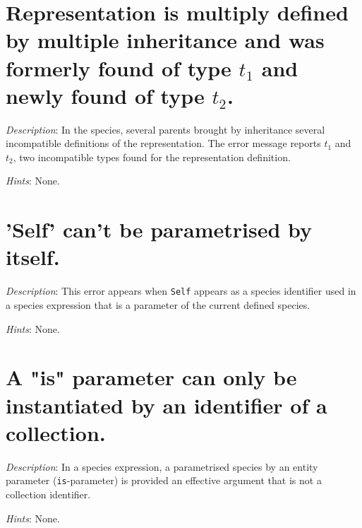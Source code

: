 \section*{Representation is multiply defined by multiple
  inheritance and was formerly found of type $t_1$ and newly found of
  type $t_2$.}

{\em Description}: In the species, several parents brought by
inheritance several incompatible definitions of the representation. The error message reports $t_1$ and $t_2$, two incompatible
types found for the representation definition.

{\em Hints}: None.



\section*{'Self' can't be parametrised by itself.}

{\em Description}: This error appears when {\tt Self} appears as a
species identifier used in a species expression that is a parameter of
the current defined species.



{\em Hints}: None.



\section*{A  "is"  parameter can only be  instantiated by an identifier of a collection.}

{\em Description}: In a species expression, a parametrised species by
an entity parameter ({\tt is}-parameter) is provided an effective
argument that is not a collection identifier.

{\em Hints}: None.

